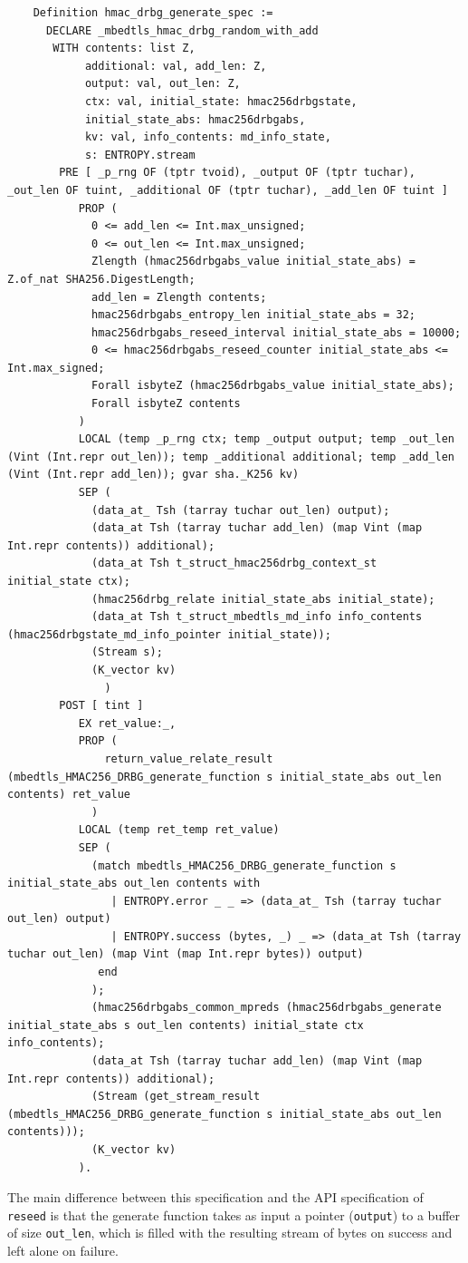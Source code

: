 \documentclass[pageno]{jpaper}
\begin{document}
\begin{lstlisting}
    Definition hmac_drbg_generate_spec :=
      DECLARE _mbedtls_hmac_drbg_random_with_add
       WITH contents: list Z,
            additional: val, add_len: Z,
            output: val, out_len: Z,
            ctx: val, initial_state: hmac256drbgstate,
            initial_state_abs: hmac256drbgabs,
            kv: val, info_contents: md_info_state,
            s: ENTROPY.stream
        PRE [ _p_rng OF (tptr tvoid), _output OF (tptr tuchar), _out_len OF tuint, _additional OF (tptr tuchar), _add_len OF tuint ]
           PROP (
             0 <= add_len <= Int.max_unsigned;
             0 <= out_len <= Int.max_unsigned;
             Zlength (hmac256drbgabs_value initial_state_abs) = Z.of_nat SHA256.DigestLength;
             add_len = Zlength contents;
             hmac256drbgabs_entropy_len initial_state_abs = 32;
             hmac256drbgabs_reseed_interval initial_state_abs = 10000;
             0 <= hmac256drbgabs_reseed_counter initial_state_abs <= Int.max_signed;
             Forall isbyteZ (hmac256drbgabs_value initial_state_abs);
             Forall isbyteZ contents
           )
           LOCAL (temp _p_rng ctx; temp _output output; temp _out_len (Vint (Int.repr out_len)); temp _additional additional; temp _add_len (Vint (Int.repr add_len)); gvar sha._K256 kv)
           SEP (
             (data_at_ Tsh (tarray tuchar out_len) output);
             (data_at Tsh (tarray tuchar add_len) (map Vint (map Int.repr contents)) additional);
             (data_at Tsh t_struct_hmac256drbg_context_st initial_state ctx);
             (hmac256drbg_relate initial_state_abs initial_state);
             (data_at Tsh t_struct_mbedtls_md_info info_contents (hmac256drbgstate_md_info_pointer initial_state));
             (Stream s);
             (K_vector kv)
               )
        POST [ tint ]
           EX ret_value:_,
           PROP (
               return_value_relate_result (mbedtls_HMAC256_DRBG_generate_function s initial_state_abs out_len contents) ret_value
             )
           LOCAL (temp ret_temp ret_value)
           SEP (
             (match mbedtls_HMAC256_DRBG_generate_function s initial_state_abs out_len contents with
                | ENTROPY.error _ _ => (data_at_ Tsh (tarray tuchar out_len) output)
                | ENTROPY.success (bytes, _) _ => (data_at Tsh (tarray tuchar out_len) (map Vint (map Int.repr bytes)) output)
              end
             );
             (hmac256drbgabs_common_mpreds (hmac256drbgabs_generate initial_state_abs s out_len contents) initial_state ctx info_contents);
             (data_at Tsh (tarray tuchar add_len) (map Vint (map Int.repr contents)) additional);
             (Stream (get_stream_result (mbedtls_HMAC256_DRBG_generate_function s initial_state_abs out_len contents)));
             (K_vector kv)
           ).
\end{lstlisting}

The main difference between this specification and the API specification of \lstinline{reseed} is that the generate function takes as input a pointer (\lstinline{output}) to a buffer of size \lstinline{out_len}, which is filled with the resulting stream of bytes on success and left alone on failure.
\end{document}

